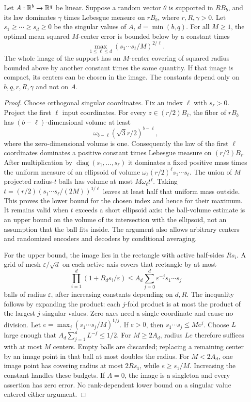 \begin{lemma}
\label{lem:v18-thick-linear}
Let $A:\mathbb R^b\to\mathbb R^q$ be linear. Suppose a random vector $\theta$ is
supported in $RB_b$, and its law dominates $\gamma$ times Lebesgue
measure on $rB_b$, where $r,R,\gamma>0$. Let $s_1\ge\cdots\ge s_d\ge0$
be the singular values of $A$, $d=\min(b,q)$. For all $M\ge1$, the
optimal mean squared $M$-center error is bounded below by a constant
times
\[
 \max_{1\le\ell\le d}(s_1\cdots s_\ell/M)^{2/\ell}.
\]
The whole image of the support has an $M$-center covering of squared
radius bounded above by another constant times the same quantity.
If that image is compact, its centers can be chosen in the image.
The constants depend only on $b,q,r,R,\gamma$ and not on $A$.
\end{lemma}
\begin{proof}
Choose orthogonal singular coordinates. Fix an index $\ell$ with
$s_\ell>0$. Project the first $\ell$ input coordinates. For every
$z\in(r/2)B_\ell$, the fiber of $rB_b$ has
$(b-\ell)$-dimensional volume at least
\[
 \omega_{b-\ell}(\sqrt3r/2)^{b-\ell},
\]
where the zero-dimensional volume is one. Consequently the law of
the first $\ell$ coordinates dominates a positive constant times
Lebesgue measure on $(r/2)B_\ell$. After multiplication by
$\operatorname{diag}(s_1,\ldots,s_\ell)$ it dominates a fixed positive
mass times the uniform measure of an ellipsoid of volume
$\omega_\ell(r/2)^\ell s_1\cdots s_\ell$. The union of $M$
projected radius-$t$ balls has volume at most $M\omega_\ell t^\ell$.
Taking $t=(r/2)(s_1\cdots s_\ell/(2M))^{1/\ell}$ leaves at least
half that uniform mass outside. This proves the lower bound for the
chosen index and hence for their maximum. It remains valid when $t$
exceeds a short ellipsoid axis: the ball-volume estimate is an upper
bound on the volume of its intersection with the ellipsoid, not an
assumption that the ball fits inside. The argument also allows arbitrary
centers and randomized encoders and decoders by conditional averaging.

For the upper bound, the image lies in the rectangle with active
half-sides $Rs_i$. A grid of mesh $\varepsilon/\sqrt d$ on each active
axis covers that rectangle by at most
\[
 \prod_{i=1}^d(1+B_ds_i/\varepsilon)
 \le A_d\sum_{j=0}^d\varepsilon^{-j}s_1\cdots s_j
\]
balls of radius $\varepsilon$, after increasing constants depending
on $d,R$. The inequality follows by expanding the product: each
$j$-fold product is at most the product of the largest $j$ singular
values. Zero axes need a single coordinate and cause no division.
Let $e=\max_j(s_1\cdots s_j/M)^{1/j}$. If $e>0$, then
$s_1\cdots s_j\le Me^j$. Choose $L$ large enough that
$A_d\sum_{j=1}^dL^{-j}\le1/2$. For $M\ge2A_d$, radius $Le$
therefore suffices with at most $M$ centers. Empty balls are discarded;
replacing a remaining center by an image point in that ball at most
doubles the radius. For $M<2A_d$, one image point has covering radius
at most $2Rs_1$, while $e\ge s_1/M$. Increasing the constant handles
these budgets. If $A=0$, the image is a singleton and every assertion
has zero error. No rank-dependent lower bound on a singular value
entered either argument.
\end{proof}

